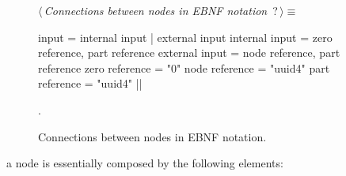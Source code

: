 \documentclass[%
    a4paper,    %
    justified,  %
    nobib,      %
    openany     %
]{tufte-book}
\begin{document}
\begin{figure}
\begin{flushleft} \small
\begin{minipage}{\linewidth}\label{scrap62}\raggedright\small
{} $\langle\,${\itshape Connections between nodes in EBNF notation}\nobreak\ {\footnotesize {?}}$\,\rangle\equiv$
\vspace{-1ex}
\begin{pythoncode}
input = internal input | external input
internal input = zero reference, part reference
external input = node reference, part reference
zero reference = "0"
node reference = "uuid4"
part reference = "uuid4"
|\NWsep|
\end{pythoncode}
\vspace{1.5ex}
\footnotesize
\begin{list}{}{\setlength{\itemsep}{-\parsep}\setlength{\itemindent}{-\leftmargin}}
\item {\NWtxtMacroNoRef}.

\item{}
\end{list}
\end{minipage}\vspace{4ex}
\end{flushleft}
\caption{Connections between nodes in EBNF notation.}
\label{node-graph:lst:node-connections-ebnf}
\end{figure}

%

 a node is essentially
composed by the following elements:
\end{document}
